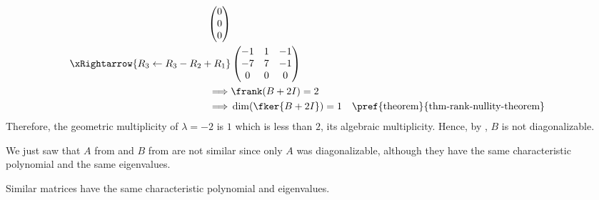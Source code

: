 \begin{exm}
\begin{enumerate}
\begin{align*}
\begin{pmatrix}
				      0 \\ 0 \\ 0
			      \end{pmatrix}                                                      \\
			      \xRightarrow{R_3\leftarrow R_3-R_2+R_1}
			                               & \begin{pmatrix}
				      -1 & 1 & -1 \\
				      -7 & 7 & -1 \\
				      0  & 0 & 0
			      \end{pmatrix}                                                                                                             \\
			      \implies
			                               & \frank(B + 2 I)=2                                                                                                                       \\
			      \implies
			                               & \dim(\fker{B + 2 I})=1                                                             &  & \text{\pref{theorem}{thm-rank-nullity-theorem}}
		      \end{align*}
		      Therefore, the geometric multiplicity of $\lambda=-2$ is $1$ which is less than $2$,
		      its algebraic multiplicity. Hence, by ,
		      $B$ is not diagonalizable.
	\end{enumerate}
\end{exm}

\begin{rem}
	We just saw that $A$ from 
	and $B$ from  are not similar since only
	$A$ was diagonalizable, although they have the same characteristic polynomial
	and the same eigenvalues.
\end{rem}

\begin{thm}\label{thm-similar-matrices-same-polynomial-eigenvalues}
	Similar matrices have the same characteristic polynomial and eigenvalues.
\end{thm}

